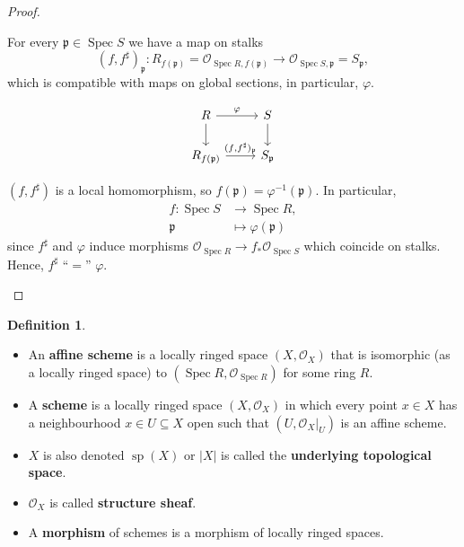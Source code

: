 \documentclass[12pt]{article}
\DeclareMathOperator{\Spec}{Spec}
\DeclareMathOperator{\spa}{sp}
\theoremstyle{definition}
\newtheorem*{definition}{Definition}
\begin{document}
\begin{proof}
\begin{enumerate}
For every $\mathfrak p\in\Spec S$ we have a map on stalks
\[(f,f^\sharp)_\mathfrak p:R_{f(\mathfrak p)}=\mathcal O_{\Spec R,f(\mathfrak p)}\longrightarrow\mathcal O_{\Spec S,\mathfrak p}=S_\mathfrak p,\]
which is compatible with maps on global sections, in particular, $\varphi$.

\[\begin{tikzcd}R\arrow[r,"\varphi"]\arrow[d]&S\arrow[d]\\R_{f(\mathfrak p)}\arrow[r,"(f{,}f^\sharp)_\mathfrak p"]&S_\mathfrak p\end{tikzcd}\]

$(f,f^\sharp)$ is a local homomorphism, so $f(\mathfrak p)=\varphi^{-1}(\mathfrak p)$. In particular,
\begin{align*}
f:\Spec S&\longrightarrow\Spec R,\\\mathfrak p&\longmapsto\varphi(\mathfrak p)
\end{align*}
since $f^\sharp$ and $\varphi$ induce morphisms $\mathcal O_{\Spec R}\rightarrow f_*\mathcal O_{\Spec S}$ which coincide on stalks. Hence, $f^\sharp$ ``$=$'' $\varphi$.
\end{enumerate}
\end{proof}

\begin{definition}
\begin{itemize}
\item An \textbf{affine scheme} is a locally ringed space $(X,\mathcal O_X)$ that is isomorphic (as a locally ringed space) to $(\Spec R,\mathcal O_{\Spec R})$ for some ring $R$.

\item A \textbf{scheme} is a locally ringed space $(X,\mathcal O_X)$ in which every point $x\in X$ has a neighbourhood $x\in U\subseteq X$ open such that $(U,\mathcal O_X|_U)$ is an affine scheme.

\item $X$ is also denoted $\spa(X)$ or $|X|$ is called the \textbf{underlying topological space}.

\item $\mathcal O_X$ is called \textbf{structure sheaf}.

\item A \textbf{morphism} of schemes is a morphism of locally ringed spaces.
\end{itemize}
\end{definition}
\end{document}
